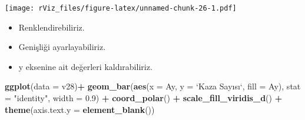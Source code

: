 \documentclass[
]{book}
\newenvironment{Shaded}{\begin{snugshade}}{\end{snugshade}}
\newcommand{\DataTypeTok}[1]{\textcolor[rgb]{0.13,0.29,0.53}{#1}}
\newcommand{\FloatTok}[1]{\textcolor[rgb]{0.00,0.00,0.81}{#1}}
\newcommand{\KeywordTok}[1]{\textcolor[rgb]{0.13,0.29,0.53}{\textbf{#1}}}
\newcommand{\NormalTok}[1]{#1}
\newcommand{\OperatorTok}[1]{\textcolor[rgb]{0.81,0.36,0.00}{\textbf{#1}}}
\newcommand{\StringTok}[1]{\textcolor[rgb]{0.31,0.60,0.02}{#1}}
\begin{document}
\begin{Shaded}
\end{Shaded}

\texttt{[image: rViz\_files/figure-latex/unnamed-chunk-26-1.pdf]}

\begin{itemize}
\item
  Renklendirebiliriz.
\item
  Genişliği ayarlayabiliriz.
\item
  y eksenine ait değerleri kaldırabiliriz.
\end{itemize}

\begin{Shaded}
\begin{Highlighting}[]
\KeywordTok{ggplot}\NormalTok{(}\DataTypeTok{data =}\NormalTok{ v28)}\OperatorTok{+}
\StringTok{  }\KeywordTok{geom_bar}\NormalTok{(}\KeywordTok{aes}\NormalTok{(}\DataTypeTok{x =}\NormalTok{ Ay, }\DataTypeTok{y =} \StringTok{`}\DataTypeTok{Kaza Sayısı}\StringTok{`}\NormalTok{, }\DataTypeTok{fill =}\NormalTok{ Ay), }\DataTypeTok{stat =} \StringTok{"identity"}\NormalTok{, }\DataTypeTok{width =} \FloatTok{0.9}\NormalTok{) }\OperatorTok{+}
\StringTok{  }\KeywordTok{coord_polar}\NormalTok{() }\OperatorTok{+}
\StringTok{  }\KeywordTok{scale_fill_viridis_d}\NormalTok{() }\OperatorTok{+}
\StringTok{  }\KeywordTok{theme}\NormalTok{(}\DataTypeTok{axis.text.y =} \KeywordTok{element_blank}\NormalTok{())}
\end{Highlighting}
\end{Shaded}
\end{document}

